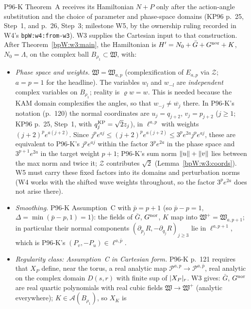 \begin{remark}\label{bpW:w3:interface}
P96-K Theorem~A receives its Hamiltonian $N+P$ only after the action-angle substitution and the choice of parameter
and phase-space domains (KP96 p.~25, Step~1, and p.~26, Step~3; milestone W5, by the ownership ruling recorded in W4's \texttt{bpW:w4:from-w3}). W3 supplies the Cartesian input to that
construction. After Theorem~\ref{bpW:w3:main}, the Hamiltonian is $H'=N_0+\bar G+G^{\rm nor}+K$, $N_0=\Lambda$, on the complex
ball $B_{\rho_1}\subset\mathfrak W$, with:
\begin{itemize}
\item \emph{Phase space and weights.} $\mathfrak W=\mathfrak W_{a,p}$ (complexification of $E_{a,p}$ via $\mathcal Z$;
  $a=p=1$ for the headline). The variables $w_l$ and $w_{-l}$ are \emph{independent} complex variables on
  $B_{\rho_1}$; reality is $\varrho w=w$. This is needed because the KAM domain complexifies the angles, so that
  $w_{-j}\ne\overline{w_j}$ there. In P96-K's notation (p.~120) the normal coordinates are $u_j=q_{j+2}$,
  $v_j=p_{j+2}$ ($j\ge1$; KP96 p.~25, Step~1, with $q_j^{\rm KP}=\sqrt2z_j$), in $\ell^{a,p}$ with weights
  $(j+2)^pe^{a(j+2)}$. Since $j^pe^{aj}\le(j+2)^pe^{a(j+2)}\le3^pe^{2a}j^pe^{aj}$, these are equivalent to P96-K's
  $j^pe^{aj}$ within the factor $3^pe^{2a}$ in the phase space and $3^{p+1}e^{2a}$ in the target weight $p+1$; P96-K's
  sum norm $\lVert u\rVert+\lVert v\rVert$ lies between the max norm and twice it; $\mathcal Z$ contributes $\sqrt2$
  (Lemma~\ref{bpW:w3:coords}). W5 must carry these fixed factors into its domains and perturbation norms (W4 works
  with the shifted wave weights throughout, so the factor $3^pe^{2a}$ does not arise there).
\item \emph{Smoothing.} P96-K Assumption~C with $\bar p=p+1$ (so $\bar p-p=1$, $\Delta=\min(\bar p-p,1)=1$): the
  fields of $\bar G$, $G^{\rm nor}$, $K$ map into $\mathfrak W^+=\mathfrak W_{a,p+1}$; in particular their normal
  components $(\partial_{p_j}R,-\partial_{q_j}R)_{j\ge3}$ lie in $\ell^{a,p+1}$, which is P96-K's
  $(P_v,-P_u)\in\ell^{a,\bar p}$.
\item \emph{Regularity class: Assumption~C in Cartesian form.} P96-K p.~121 requires that $X_P$ define, near the
  torus, a real analytic map $\mathcal P^{a,p}\to\mathcal P^{a,\bar p}$, real analytic on the complex domain
  $D(s,r)$ with finite sup of $\lvert X_P\rvert_r$. W3 gives: $\bar G$, $G^{\rm nor}$ are real quartic polynomials with
  real cubic fields $\mathfrak W\to\mathfrak W^+$ (analytic everywhere); $K\in\mathcal A(B_{\rho_1})$, so $X_K$ is

\end{itemize}
\end{remark}
